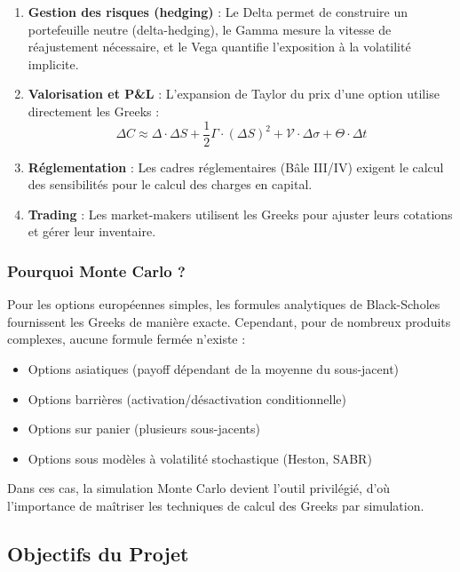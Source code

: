 \documentclass[a4paper,11pt]{article}
\theoremstyle{definition}
\begin{document}
\begin{enumerate}[label=(\roman*)]
    \item \textbf{Gestion des risques (hedging)} : Le Delta permet de construire un portefeuille neutre (delta-hedging), le Gamma mesure la vitesse de réajustement nécessaire, et le Vega quantifie l'exposition à la volatilité implicite.
    
    \item \textbf{Valorisation et P\&L} : L'expansion de Taylor du prix d'une option utilise directement les Greeks :
    $$\Delta C \approx \Delta \cdot \Delta S + \frac{1}{2}\Gamma \cdot (\Delta S)^2 + \mathcal{V} \cdot \Delta\sigma + \Theta \cdot \Delta t$$
    
    \item \textbf{Réglementation} : Les cadres réglementaires (Bâle III/IV) exigent le calcul des sensibilités pour le calcul des charges en capital.
    
    \item \textbf{Trading} : Les market-makers utilisent les Greeks pour ajuster leurs cotations et gérer leur inventaire.
\end{enumerate}

\subsubsection{Pourquoi Monte Carlo ?}

Pour les options européennes simples, les formules analytiques de Black-Scholes fournissent les Greeks de manière exacte. Cependant, pour de nombreux produits complexes, aucune formule fermée n'existe :

\begin{itemize}
    \item Options asiatiques (payoff dépendant de la moyenne du sous-jacent)
    \item Options barrières (activation/désactivation conditionnelle)
    \item Options sur panier (plusieurs sous-jacents)
    \item Options sous modèles à volatilité stochastique (Heston, SABR)
\end{itemize}

Dans ces cas, la simulation Monte Carlo devient l'outil privilégié, d'où l'importance de maîtriser les techniques de calcul des Greeks par simulation.

\subsection{Objectifs du Projet}
\end{document}
